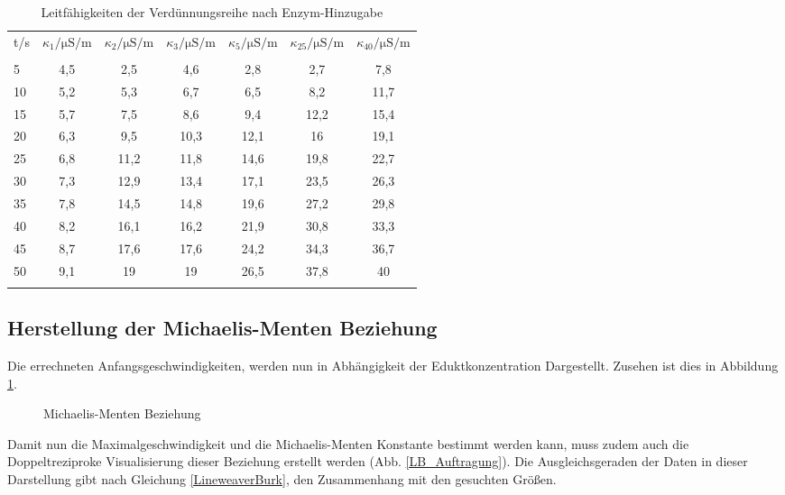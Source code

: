 \begin{table}[b]
  \centering
\vspace{5mm}
  \begin{tabular}{l|cccccc}
t/\unit{\second}& $\kappa_{1}/\unit{\micro\siemens\per\meter}$	& $\kappa_{2}/\unit{\micro\siemens\per\meter}$ & $\kappa_{3}/\unit{\micro\siemens\per\meter}$ & $\kappa_{5}/\unit{\micro\siemens\per\meter}$ & $\kappa_{25}/\unit{\micro\siemens\per\meter}$ & $\kappa_{40}/\unit{\micro\siemens\per\meter}$\\
\vspace{-3mm}& \\
\hline
\hline
5 & 4,5 & 2,5 & 4,6 & 2,8 & 2,7 & 7,8\\
10 & 5,2 & 5,3 & 6,7 & 6,5 & 8,2 & 11,7\\
15 & 5,7 & 7,5 & 8,6 & 9,4 & 12,2 & 15,4\\
20 & 6,3 & 9,5 & 10,3 & 12,1 & 16 & 19,1\\
25 & 6,8 & 11,2 & 11,8 & 14,6 & 19,8 & 22,7\\
30 & 7,3 & 12,9 & 13,4 & 17,1 & 23,5 & 26,3\\
35 & 7,8 & 14,5 & 14,8 & 19,6 & 27,2 & 29,8\\
40 & 8,2 & 16,1 & 16,2 & 21,9 & 30,8 & 33,3\\
45 & 8,7 & 17,6 & 17,6 & 24,2 & 34,3 & 36,7\\
50 & 9,1 & 19 & 19 & 26,5 & 37,8 & 40\\
    \hline& 
  \end{tabular}
  \caption{Leitfähigkeiten der Verdünnungsreihe nach Enzym-Hinzugabe}
  \label{Daten_V1}
\end{table}





\subsection{Herstellung der Michaelis-Menten Beziehung}
Die errechneten Anfangsgeschwindigkeiten, werden nun in Abhängigkeit der Eduktkonzentration Dargestellt.
Zusehen ist dies in Abbildung \ref{MM-Beziehung}.
\begin{figure}[t]
\centering

\caption{Michaelis-Menten Beziehung}
\label{MM-Beziehung}
\end{figure}
Damit nun die Maximalgeschwindigkeit und die Michaelis-Menten Konstante bestimmt werden kann, muss zudem auch die Doppeltreziproke Visualisierung dieser Beziehung erstellt werden (Abb. \ref{LB_Auftragung}).
Die Ausgleichsgeraden der Daten in dieser Darstellung gibt nach Gleichung \ref{LineweaverBurk}, den Zusammenhang mit den gesuchten Größen.

